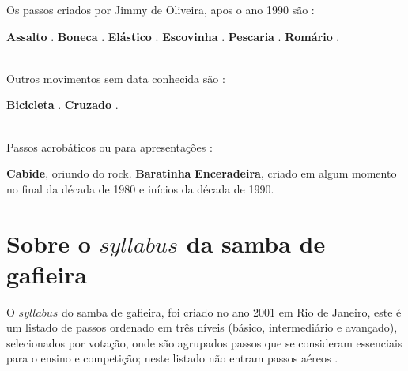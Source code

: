 Os passos criados por Jimmy de Oliveira, apos o ano 1990 são \cite{sambafunkeadoJimmyDeOliveiraPart1}: 
\begin{tasks}
\task \textbf{Assalto} . 
\task \textbf{Boneca} .
\task \textbf{Elástico} .
\task \textbf{Escovinha} .
\task \textbf{Pescaria} .
\task \textbf{Romário} .
\end{tasks}~\\


Outros movimentos sem data conhecida são \cite[pp. 143]{perna2002samba}:
\begin{tasks}
\task \textbf{Bicicleta} .
\task \textbf{Cruzado} .
\end{tasks}~\\


Passos acrobáticos ou para apresentações \cite[pp. 142-143]{perna2002samba}:
\begin{tasks}
\task \textbf{Cabide},  oriundo do rock.
\task \textbf{Baratinha} 
\task \textbf{Enceradeira},  criado em algum momento no final da década de 1980 e inícios da década de 1990.
\end{tasks}


\section{Sobre o $syllabus$ da samba de gafieira}

O $syllabus$  do samba de gafieira, foi criado no ano 2001 em Rio de Janeiro,
este é um listado de passos ordenado em três níveis (básico, intermediário e avançado),
selecionados por votação,
onde são agrupados passos que se consideram essenciais para o ensino e competição;
neste listado não entram passos aéreos \cite[pp. 144]{perna2002samba}.



